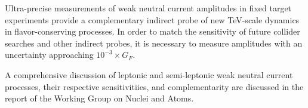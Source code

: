 
Ultra-precise measurements of weak neutral current amplitudes in fixed target experiments provide a complementary indirect probe of new TeV-scale dynamics in flavor-conserving processes.
In order to match the sensitivity of future collider
searches and other indirect probes, it is necessary to measure amplitudes with an uncertainty
approaching $10^{-3}\times G_F$. 

A comprehensive discussion of leptonic and semi-leptonic weak neutral current processes, their respective 
sensitivitiies, and complementarity are discussed in the report of the Working Group on Nuclei and Atoms. 

